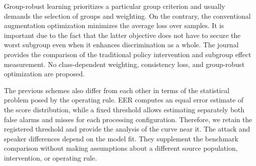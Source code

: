 Group-robust learning prioritizes a particular group criterion and usually demands the selection of groups and weighting. On the contrary, the conventional augmentation optimization minimizes the average loss over samples. It is important due to the fact that the latter objective does not have to secure the worst subgroup even when it enhances discrimination as a whole. The journal provides the comparison of the traditional policy intervention and subgroup effect measurement. No class-dependent weighting, consistency loss, and group-robust optimization are proposed.

The previous schemes also differ from each other in terms of the statistical problem posed by the operating rule. EER computes an equal error estimate of the score distribution, while a fixed threshold allows estimating separately both false alarms and misses for each processing configuration. Therefore, we retain the registered threshold and provide the analysis of the curve near it. The attack and speaker differences depend on the model fit. They supplement the benchmark comparison without making assumptions about a different source population, intervention, or operating rule.
